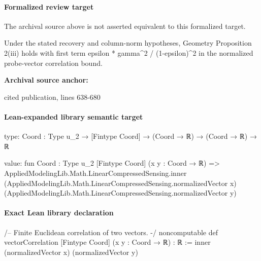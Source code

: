 \documentclass[10pt]{article}
\begin{document}
\paragraph{Formalized review target}
The archival source above is not asserted equivalent to this formalized target.
\begin{ReviewVerbatim}
Under the stated recovery and column-norm hypotheses, Geometry Proposition 2(iii) holds with first term epsilon * gamma^2 / (1-epsilon)^2 in the normalized probe-vector correlation bound.
\end{ReviewVerbatim}

\textbf{Archival source anchor:} {\footnotesize\raggedright cited publication, lines 638-\allowbreak{}680\par}
\paragraph{Lean-expanded library semantic target}
\begin{ReviewVerbatim}
type:
{Coord : Type u_2} → [Fintype Coord] → (Coord → ℝ) → (Coord → ℝ) → ℝ

value:
fun {Coord : Type u_2} [Fintype Coord] (x y : Coord → ℝ) =>
  AppliedModelingLib.Math.LinearCompressedSensing.inner
    (AppliedModelingLib.Math.LinearCompressedSensing.normalizedVector x)
    (AppliedModelingLib.Math.LinearCompressedSensing.normalizedVector y)
\end{ReviewVerbatim}

\paragraph{Exact Lean library declaration}
\begin{ReviewVerbatim}
/-- Finite Euclidean correlation of two vectors. -/
noncomputable def vectorCorrelation [Fintype Coord]
    (x y : Coord → ℝ) : ℝ :=
  inner (normalizedVector x) (normalizedVector y)
\end{ReviewVerbatim}
\end{document}
